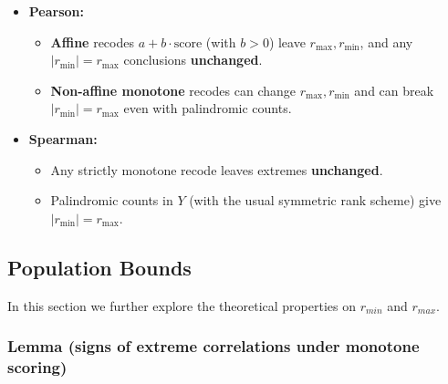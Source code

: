 \documentclass[
  12pt,
]{article}
\theoremstyle{plain}
\theoremstyle{definition}
\theoremstyle{remark}
\begin{document}
\begin{itemize}
\item
  \textbf{Pearson:}

  \begin{itemize}
  \item
    \textbf{Affine} recodes \(a+b\cdot\text{score}\) (with \(b>0\))
    leave \(r_{\max}, r_{\min}\), and any \(|r_{\min}|=r_{\max}\)
    conclusions \textbf{unchanged}.
  \item
    \textbf{Non-affine monotone} recodes can change
    \(r_{\max}, r_{\min}\) and can break \(|r_{\min}|=r_{\max}\) even
    with palindromic counts.
  \end{itemize}
\item
  \textbf{Spearman:}

  \begin{itemize}
  \item
    Any strictly monotone recode leaves extremes \textbf{unchanged}.
  \item
    Palindromic counts in \(Y\) (with the usual symmetric rank scheme)
    give \(|r_{\min}|=r_{\max}\).
  \end{itemize}
\end{itemize}

\subsection{Population Bounds}\label{population-bounds}

In this section we further explore the theoretical properties on
\(r_{min}\) and \(r_{max}\).

\subsubsection{Lemma (signs of extreme correlations under monotone
scoring)}\label{lemma-signs-of-extreme-correlations-under-monotone-scoring}
\end{document}
